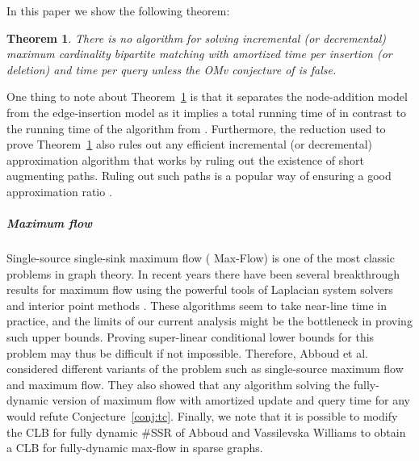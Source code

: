 \documentclass[a4paper,11pt]{article}
\newtheorem{theorem}{Theorem}
\theoremstyle{definition}
\begin{document}
In this paper we show the following theorem:
\begin{theorem}\label{thm:matching}
    There is no algorithm for solving incremental (or decremental) maximum
    cardinality
    bipartite matching with amortized time  per insertion (or
    deletion) and  time per query unless the OMv conjecture of
    \cite{HenzingerKNS15} is false.
\end{theorem}
One thing to note about Theorem~\ref{thm:matching} is that it separates the
node-addition model from the edge-insertion model as it implies a total running
time of  in contrast to the  running time of the algorithm from \cite{BosekLSZ14}. Furthermore, the reduction used to
prove Theorem~\ref{thm:matching} also rules out any efficient incremental (or
decremental) approximation algorithm that works by ruling out the existence of
short augmenting paths. Ruling out such paths is a popular way of ensuring a
good approximation ratio \cite{NeimanS13}.

\subparagraph*{Maximum flow}
Single-source single-sink maximum flow ( Max-Flow) is one of the most
classic problems in graph theory.
In recent
years there have been several breakthrough results for  maximum flow using
the powerful tools of Laplacian system solvers and interior point methods
\cite{Madry13,Sherman13,KelnerLOS14,LeeS14}. These algorithms seem to take
near-line time in practice, and the limits of our current analysis might be the
bottleneck in proving such upper bounds. Proving super-linear conditional
lower bounds for this problem may
thus be difficult if not impossible. Therefore, Abboud et al.~\cite{AbboudVY15}
considered different variants of the problem such as single-source maximum flow
and  maximum flow. They also showed that any algorithm solving the
fully-dynamic version of  maximum flow with amortized update and query time
 for any  would refute Conjecture~\ref{conj:tc}.
Finally, we note that it is possible to modify the  CLB for fully
dynamic \#SSR of Abboud and Vassilevska Williams \cite{AbboudV14} to obtain a
 CLB for fully-dynamic  max-flow in sparse graphs.
\end{document}
